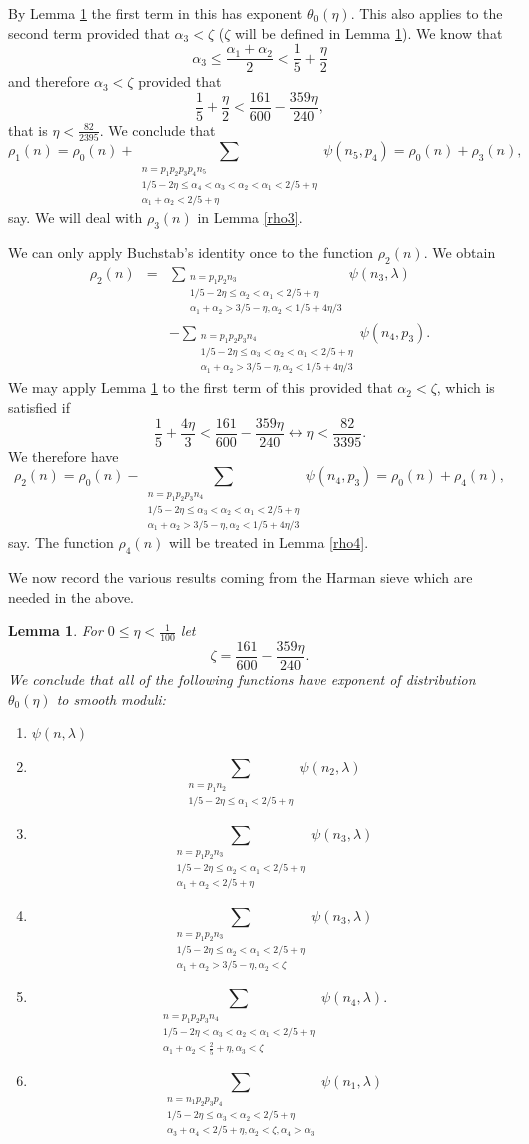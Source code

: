 \documentclass[12pt]{amsart}
\theoremstyle{plain}
\newtheorem{lem}{Lemma}
\theoremstyle{definition}
\numberwithin{equation}{section}
\def \a{\alpha} \def \b{\beta} \def \d{\delta} \def \e{\varepsilon} \def \g{\gamma} \def \k{\kappa} \def \l{\lambda} \def \s{\sigma} \def \t{\theta} \def \z{\zeta}
\newcommand{\twosum}[2]{\sum_{\substack{#1\\#2}}}
\newcommand{\threesum}[3]{\sum_{\substack{#1\\#2\\#3}}}
\begin{document}
By Lemma \ref{fundlem} the first term in this has exponent $\theta_0(\eta)$.  This also applies to the second term provided that $\a_3<\zeta$ ($\zeta$ will be defined in Lemma \ref{fundlem}).  We know that 
$$\a_3\leq \frac{\a_1+\a_2}{2}<\frac15+\frac{\eta}{2}$$
and therefore $\a_3<\zeta$ provided that 
$$\frac{1}{5}+\frac{\eta}{2}<\frac{161}{600}-\frac{359\eta}{240},$$ 
that is $\eta<\frac{82}{2395}$.  We conclude that 
$$\rho_1(n)=\rho_0(n)+\threesum{n=p_1p_2p_3p_4n_5}{1/5-2\eta\leq \a_4<\a_3<\a_2<\a_1< 2/5+\eta}{\a_1+\a_2<2/5+\eta}\psi(n_5,p_4)=\rho_0(n)+\rho_3(n),$$ 
say.  We will deal with $\rho_3(n)$ in Lemma \ref{rho3}.

We can only apply Buchstab's identity once to the function $\rho_2(n)$. We obtain 
\begin{eqnarray*}
\rho_2(n)&=&\threesum{n=p_1p_2n_3}{1/5-2\eta\leq \a_2<\a_1< 2/5+\eta}{\a_1+\a_2>3/5-\eta,\a_2<1/5+4\eta/3}\psi(n_3,\l)\\
&&-\threesum{n=p_1p_2p_3n_4}{1/5-2\eta\leq \a_3<\a_2<\a_1< 2/5+\eta}{\a_1+\a_2>3/5-\eta,\a_2<1/5+4\eta/3}\psi(n_4,p_3).
\end{eqnarray*}
We may apply Lemma \ref{fundlem} to the first term of this provided that $\a_2<\zeta$, which is satisfied if 
$$\frac{1}{5}+\frac{4\eta}{3}<\frac{161}{600}-\frac{359\eta}{240}\longleftrightarrow \eta< \frac{82}{3395}.$$
We therefore have
$$\rho_2(n)=\rho_0(n)-\threesum{n=p_1p_2p_3n_4}{1/5-2\eta\leq \a_3<\a_2<\a_1< 2/5+\eta}{\a_1+\a_2>3/5-\eta,\a_2<1/5+4\eta/3}\psi(n_4,p_3)=\rho_0(n)+\rho_4(n),$$
say.  The function $\rho_4(n)$ will be treated in Lemma \ref{rho4}.  

We now record the various results coming from the Harman sieve which are needed in the above.

\begin{lem}\label{fundlem}
For $0\leq \eta<\frac{1}{100}$ let 
$$\zeta=\frac{161}{600}-\frac{359\eta}{240}.$$
We conclude that all of the following functions have exponent of distribution $\theta_0(\eta)$ to smooth moduli:
\begin{enumerate}
\item $\psi(n,\l)$

\item 
$$\twosum{n=p_1n_2}{1/5-2\eta\leq \a_1< 2/5+\eta}\psi(n_2,\l)$$

\item 
$$\threesum{n=p_1p_2n_3}{1/5-2\eta\leq \a_2<\a_1<2/5+\eta}{\a_1+\a_2<2/5+\eta}\psi(n_3,\l)$$
  
\item 
$$\threesum{n=p_1p_2n_3}{1/5-2\eta\leq \a_2<\a_1<2/5+\eta}{\a_1+\a_2>3/5-\eta,\a_2<\zeta}\psi(n_3,\l)$$

\item 
$$\threesum{n=p_1p_2p_3n_4}{1/5-2\eta<\a_3< \a_2 < \a_1<2/5+\eta}{\a_1+\a_2<\frac25+\eta,\a_3<\zeta}\psi(n_4,\l).$$

\item 
$$\threesum{n=n_1p_2p_3p_4}{1/5-2\eta\leq \a_3<\a_2< 2/5+\eta}{\a_3+\a_4<2/5+\eta,\a_2<\zeta,\a_4>\a_3}\psi(n_1,\l)$$
\end{enumerate}
\end{lem}
\end{document}
